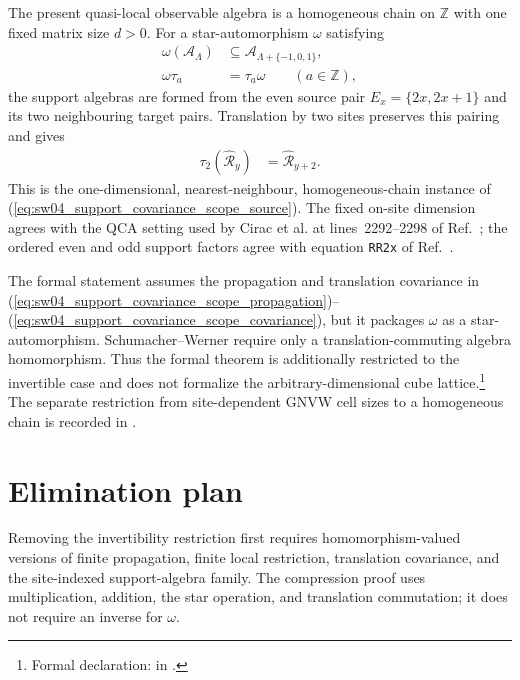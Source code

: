 \documentclass{article}
\begin{document}
The present quasi-local observable algebra is a homogeneous chain on
$\mathbb Z$ with one fixed matrix size $d>0$. For a star-automorphism
$\omega$ satisfying
\begin{align}
    \omega(\mathcal A_\Lambda)
     & \subseteq\mathcal A_{\Lambda+\{-1,0,1\}},
    \label{eq:sw04_support_covariance_scope_propagation} \\
    \omega\tau_a
     & =\tau_a\omega
    \qquad(a\in\mathbb Z),
    \label{eq:sw04_support_covariance_scope_covariance}
\end{align}
the support algebras are formed from the even source pair
$E_x=\{2x,2x+1\}$ and its two neighbouring target pairs. Translation by two
sites preserves this pairing and gives
\begin{align}
    \tau_2(\widehat{\mathcal R}_y)
     & =\widehat{\mathcal R}_{y+2}.
    \label{eq:sw04_support_covariance_scope_formal}
\end{align}
This is the one-dimensional, nearest-neighbour, homogeneous-chain instance of
(\ref{eq:sw04_support_covariance_scope_source}). The fixed
on-site dimension agrees with the QCA setting used by Cirac et al. at
lines~2292--2298 of Ref.~\cite{Cirac2017MPU}; the ordered even and odd support
factors agree with equation \texttt{RR2x} of
Ref.~\cite{Gross2012IndexTheory}.

The formal statement assumes the propagation and translation covariance in
(\ref{eq:sw04_support_covariance_scope_propagation})--%
(\ref{eq:sw04_support_covariance_scope_covariance}), but it packages $\omega$
as a star-automorphism. Schumacher--Werner require only a translation-commuting
algebra homomorphism. Thus the formal theorem is additionally restricted to
the invertible case and does not formalize the arbitrary-dimensional cube
lattice.\footnote{Formal declaration:
    in .}
The separate restriction from site-dependent GNVW cell sizes to a homogeneous
chain is recorded in
.

\section{Elimination plan}

Removing the invertibility restriction first requires homomorphism-valued
versions of finite propagation, finite local restriction, translation
covariance, and the site-indexed support-algebra family. The compression proof
uses multiplication, addition, the star operation, and translation commutation;
it does not require an inverse for $\omega$.
\end{document}
